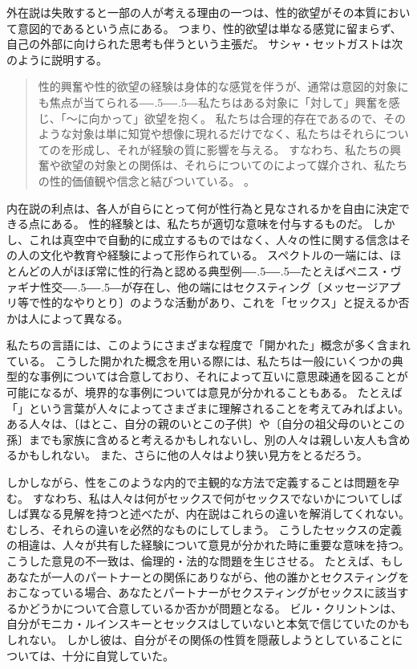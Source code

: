 \documentclass[paper=a4,book,openany]{jlreq}
\def\DDASH{―\kern-.5\zw―\kern-.5\zw―} %
\begin{document}
外在説は失敗すると一部の人が考える理由の一つは、性的欲望がその本質において意図的であるという点にある。
つまり、性的欲望は単なる感覚に留まらず、自己の外部に向けられた思考も伴うという主張だ。
サシャ・セットガストは次のように説明する。
\begin{quote}
  性的興奮や性的欲望の経験は身体的な感覚を伴うが、通常は意図的対象にも焦点が当てられる{\DDASH}私たちはある対象に「対して」興奮を感じ、「～に向かって」欲望を抱く。
私たちは合理的存在であるので、そのような対象は単に知覚や想像に現れるだけでなく、私たちはそれらについてのを形成し、それが経験の質に影響を与える。
すなわち、私たちの興奮や欲望の対象との関係は、それらについてのによって媒介され、私たちの性的価値観や信念と結びついている。  \citep[p.384, 強調は原文]{settegast18:_prost_good_sex}。
\end{quote}

内在説の利点は、各人が自らにとって何が性行為と見なされるかを自由に決定できる点にある。
性的経験とは、私たちが適切な意味を付与するものだ。
しかし、これは真空中で自動的に成立するものではなく、人々の性に関する信念はその人の文化や教育や経験によって形作られている。
スペクトルの一端には、ほとんどの人がほぼ常に性的行為と認める典型例{\DDASH}たとえばペニス・ヴァギナ性交{\DDASH}が存在し、他の端にはセクスティング〔メッセージアプリ等で性的なやりとり〕のような活動があり、これを「セックス」と捉えるか否かは人によって異なる。

私たちの言語には、このようにさまざまな程度で「開かれた」概念が多く含まれている。
こうした開かれた概念を用いる際には、私たちは一般にいくつかの典型的な事例については合意しており、それによって互いに意思疎通を図ることが可能になるが、境界的な事例については意見が分かれることもある。
たとえば「」という言葉が人々によってさまざまに理解されることを考えてみればよい。
ある人々は、〔はとこ、自分の親のいとこの子供〕や〔自分の祖父母のいとこの孫〕までも家族に含めると考えるかもしれないし、別の人々は親しい友人も含めるかもしれない。
また、さらに他の人々はより狭い見方をとるだろう。

しかしながら、性をこのような内的で主観的な方法で定義することは問題を孕む。
すなわち、私は人々は何がセックスで何がセックスでないかについてしばしば異なる見解を持つと述べたが、内在説はこれらの違いを解消してくれない。
むしろ、それらの違いを必然的なものにしてしまう。
こうしたセックスの定義の相違は、人々が共有した経験について意見が分かれた時に重要な意味を持つ。
こうした意見の不一致は、倫理的・法的な問題を生じさせる。
たとえば、もしあなたが一人のパートナーとの関係にありながら、他の誰かとセクスティングをおこなっている場合、あなたとパートナーがセクスティングがセックスに該当するかどうかについて合意しているか否かが問題となる。
ビル・クリントンは、自分がモニカ・ルインスキーとセックスはしていないと本気で信じていたのかもしれない。
しかし彼は、自分がその関係の性質を隠蔽しようとしていることについては、十分に自覚していた。
\end{document}
